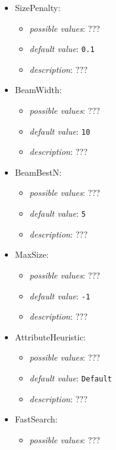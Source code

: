 \documentclass{article}
\begin{document}
\begin{itemize}
    \item SizePenalty:
           \begin{itemize}
                \item \emph{possible values}: ???
                \item \emph{default value}: \texttt{0.1}
                \item \emph{description}: ???
           \end{itemize}
    \item BeamWidth:
           \begin{itemize}
                \item \emph{possible values}: ???
                \item \emph{default value}: \texttt{10}
                \item \emph{description}: ???
           \end{itemize}
    \item BeamBestN:
           \begin{itemize}
                \item \emph{possible values}: ???
                \item \emph{default value}: \texttt{5}
                \item \emph{description}: ???
           \end{itemize}
    \item MaxSize:
           \begin{itemize}
                \item \emph{possible values}: ???
                \item \emph{default value}: \texttt{-1}
                \item \emph{description}: ???
           \end{itemize}
    \item AttributeHeuristic:
           \begin{itemize}
                \item \emph{possible values}: ???
                \item \emph{default value}: \texttt{Default}
                \item \emph{description}: ???
           \end{itemize}
    \item FastSearch:
           \begin{itemize}
                \item \emph{possible values}: ???

\end{itemize}
\end{itemize}
\end{document}
